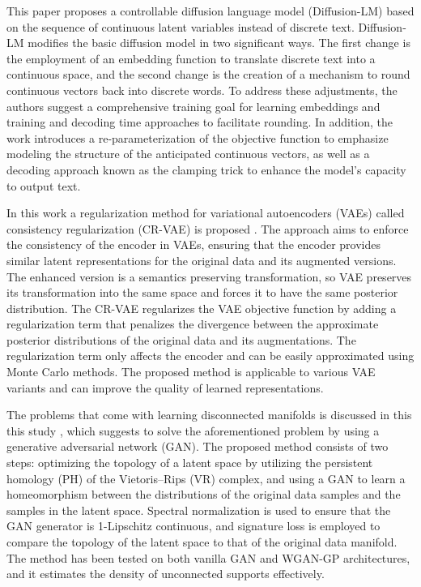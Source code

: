 This paper \cite{li2022diffusionlm} proposes a controllable diffusion language model (Diffusion-LM) based on the sequence of continuous latent variables instead of discrete text. Diffusion-LM modifies the basic diffusion model in two significant ways. The first change is the employment of an embedding function to translate discrete text into a continuous space, and the second change is the creation of a mechanism to round continuous vectors back into discrete words. To address these adjustments, the authors suggest a comprehensive training goal for learning embeddings and training and decoding time approaches to facilitate rounding. In addition, the work introduces a re-parameterization of the objective function to emphasize modeling the structure of the anticipated continuous vectors, as well as a decoding approach known as the clamping trick to enhance the model's capacity to output text.

In this work a regularization method for variational autoencoders (VAEs) called consistency regularization (CR-VAE) is proposed \cite{sinha2021consistency}. The approach aims to enforce the consistency of the encoder in VAEs, ensuring that the encoder provides similar latent representations for the original data and its augmented versions. The enhanced version is a semantics preserving transformation, so VAE preserves its transformation into the same space and forces it to have the same posterior distribution. The CR-VAE regularizes the VAE objective function by adding a regularization term that penalizes the divergence between the approximate posterior distributions of the original data and its augmentations. The regularization term only affects the encoder and can be easily approximated using Monte Carlo methods. The proposed method is applicable to various VAE variants and can improve the quality of learned representations. 

The problems that come with learning disconnected manifolds is discussed in this this study \cite{dey2020topo}, which  suggests to solve the aforementioned problem by using a generative adversarial network (GAN). The proposed method consists of two steps: optimizing the topology of a latent space by utilizing the persistent homology (PH) of the Vietoris–Rips (VR) complex, and using a GAN to learn a homeomorphism between the distributions of the original data samples and the samples in the latent space. Spectral normalization is used to ensure that the GAN generator is 1-Lipschitz continuous, and signature loss is employed to compare the topology of the latent space to that of the original data manifold. The method has been tested on both vanilla GAN and WGAN-GP architectures, and it estimates the density of unconnected supports effectively.

